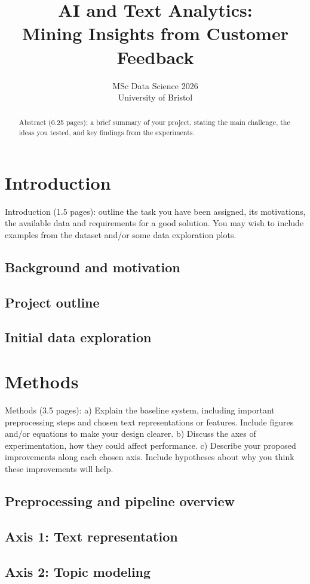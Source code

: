 \documentclass{article}
\title {AI and Text Analytics:\\Mining Insights from Customer Feedback}
\author{ MSc Data Science 2026\\ University of Bristol}
\begin{document}
\maketitle


\begin{abstract}
Abstract (0.25 pages): a brief summary of your project, stating the main challenge, the ideas you
tested, and key findings from the experiments.
\end{abstract} 

\section{Introduction}
Introduction (1.5 pages): outline the task you have been assigned, its motivations, the available
data and requirements for a good solution. You may wish to include examples from the dataset
and/or some data exploration plots.

\subsection{Background and motivation}
\subsection{Project outline}
\subsection{Initial data exploration}


\section{Methods}
Methods (3.5 pages):
a) Explain the baseline system, including important preprocessing steps and chosen text
representations or features. Include figures and/or equations to make your design clearer.
b) Discuss the axes of experimentation, how they could affect performance.
c) Describe your proposed improvements along each chosen axis. Include hypotheses about why you think these improvements will help.
\subsection{Preprocessing and pipeline overview}
\subsection{Axis 1: Text representation}
\subsection{Axis 2: Topic modeling}
\end{document}
